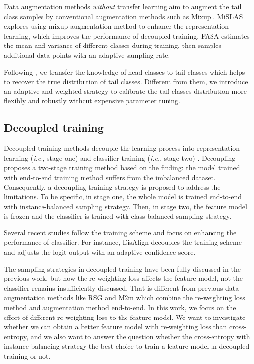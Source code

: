\documentclass[runningheads]{llncs}
\begin{document}
Data augmentation methods \textit{without} transfer learning aim to augment the tail class samples by conventional augmentation methods such as Mixup \cite{zhang2017mixup}. MiSLAS \cite{zhong2021improving} explores using mixup augmentation method to enhance the representation learning, which improves the performance of decoupled training. FASA \cite{zang2021fasa} estimates the mean and variance of different classes during training, then samples additional data points with an adaptive sampling rate. 

Following \cite{vigneswaran2021feature,yang2021free}, we transfer the knowledge of head classes to tail classes which helps to recover the true distribution of tail classes. Different from them, we introduce an adaptive and weighted strategy to calibrate the tail classes distribution more flexibly and robustly without expensive parameter tuning.


\subsection{Decoupled training}
Decoupled training methods decouple the learning process into representation learning (\emph{i.e.}, stage one) and classifier training (\emph{i.e.}, stage two) \cite{kang2019decoupling,zhong2021improving,zhang2021distribution,chu2020feature,li2021self,xiang2021coarsetofine}. Decoupling \cite{kang2019decoupling} proposes a two-stage training method based on the finding: the model trained with end-to-end training method suffers from the imbalanced dataset. Consequently, a decoupling training strategy is proposed to address the limitations. To be specific, in stage one, the whole model is trained end-to-end with instance-balanced sampling strategy. Then, in stage two, the feature model is frozen and the classifier is trained with class balanced sampling strategy. 

Several recent studies follow the training scheme and focus on enhancing the performance of classifier. For instance, DisAlign \cite{zhang2021distribution} decouples the training scheme and adjusts the logit output with an adaptive confidence score.  

The sampling strategies in decoupled training have been fully discussed in the previous work, but how the re-weighting loss affects the feature model, not the classifier remains insufficiently discussed. That is different from previous data augmentation methods like RSG \cite{wang2021rsg} and M2m \cite{kim2020m2m} which combine the re-weighting loss method and augmentation method end-to-end. In this work, we focus on the effect of different re-weighting loss to the feature model. We want to investigate whether we can obtain a better feature model with re-weighting loss than cross-entropy, and we also want to answer the question whether the cross-entropy with instance-balancing strategy the best choice to train a feature model in decoupled training or not.
\end{document}
